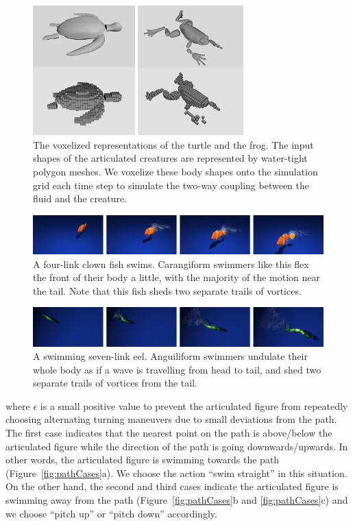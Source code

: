 \begin{figure}[!t]
\centering
\includegraphics[width=3.2in]{figures/grid1.eps}
\caption{The voxelized representations of the turtle and the frog. The input shapes of the articulated creatures are represented by water-tight polygon meshes. We voxelize these body shapes onto the simulation grid each time step to simulate the two-way coupling between the fluid and the creature.}
\label{fig:grid}
\end{figure}

\begin{figure}[ht]
\centering
\includegraphics[width=\textwidth]{figures/fish.eps}
\caption{A four-link clown fish swims. Carangiform swimmers like this flex the front of their body a little, with the
majority of the motion near the tail. Note that this fish sheds two separate trails of vortices.}
\label{fig:fish}
\end{figure}

\begin{figure}[ht]
\centering
\includegraphics[width=\textwidth]{figures/eel.eps}
\caption{A swimming seven-link eel. Anguiliform swimmers undulate their whole body as if a wave is travelling from head to tail, and shed two separate trails of vortices from the tail.}
\label{fig:eel}
\end{figure}

where $\epsilon$ is a small positive value to prevent the articulated
figure from repeatedly choosing alternating turning maneuvers due to small
deviations from the path. The first case indicates that the nearest point
on the path is above/below the articulated figure while the direction of
the path is going downwards/upwards. In other words, the articulated
figure is swimming towards the path (Figure~\ref{fig:pathCases}a). We
choose the action ``swim straight'' in this situation. On the other hand,
the second and third cases indicate the articulated figure is swimming
away from the path (Figure~\ref{fig:pathCases}b and \ref{fig:pathCases}c)
and we choose ``pitch up'' or ``pitch down'' accordingly.

